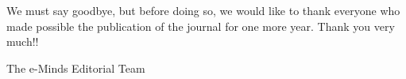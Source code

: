 We must say goodbye, but before doing so, we would like to thank everyone who made possible the publication of the journal for one more year. Thank you very much!!

\vspace*{37mm}

\begin{flushright}
The  e-Minds Editorial Team
\end{flushright}

\bigskip


